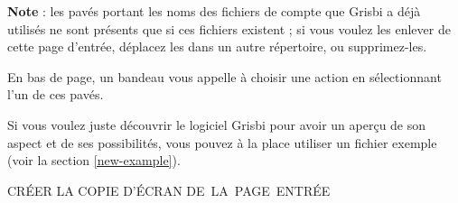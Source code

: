 
\textbf{Note} : les pavés portant les noms des fichiers de compte que Grisbi a déjà utilisés ne sont présents que si ces fichiers existent ; si vous voulez les enlever de cette page d'entrée, déplacez les dans un autre répertoire, ou supprimez-les.


En bas de page, un bandeau vous appelle à choisir une action en sélectionnant l'un de ces pavés.


Si vous voulez juste découvrir le logiciel Grisbi pour avoir un aperçu de son aspect et de ses possibilités, vous pouvez à la place utiliser un fichier exemple (voir la section \vref{new-example}).


CRÉER LA COPIE D'ÉCRAN DE LA PAGE ENTRÉE


